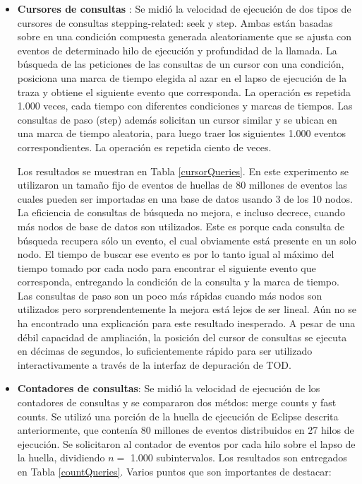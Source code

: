 \documentclass[12pt,legalpaper]{report}
\begin{document}
\begin{itemize}
	\item \textbf{Cursores de consultas} : Se midió la velocidad de ejecución de dos tipos de cursores de consultas stepping-related:  seek y step.  Ambas están basadas sobre en una condición compuesta generada aleatoriamente que se ajusta con eventos de determinado hilo de ejecución y profundidad de la llamada.  La búsqueda de las peticiones de las consultas de un cursor con una condición, posiciona una marca de tiempo elegida al azar en el lapso de ejecución de la traza y obtiene el siguiente evento que corresponda.  La operación es repetida 1.000 veces, cada tiempo con diferentes condiciones y marcas de tiempos.  Las consultas de paso (step) además solicitan un cursor similar y se ubican en una marca de tiempo aleatoria, para luego traer los siguientes 1.000 eventos correspondientes.  La operación es repetida ciento de veces.
	
Los resultados se muestran en Tabla \ref{cursorQueries}.  En este experimento se utilizaron un tamaño fijo de eventos de huellas de 80 millones de eventos las cuales pueden ser importadas en una base de datos usando 3 de los 10 nodos.  La eficiencia de consultas de búsqueda no mejora, e incluso decrece, cuando más nodos de base de datos son utilizados.  Este es porque cada consulta de búsqueda recupera sólo un evento, el cual obviamente está presente en un solo nodo.  El tiempo de buscar ese evento es por lo tanto igual al máximo del tiempo tomado por cada nodo para encontrar el siguiente evento que corresponda, entregando la condición de la consulta y la marca de tiempo. Las consultas de paso son un poco más rápidas cuando más nodos son utilizados pero sorprendentemente la mejora está lejos de ser lineal.  Aún no se ha encontrado una explicación para este resultado inesperado.  A pesar de una débil capacidad de ampliación, la posición del cursor de consultas se ejecuta en décimas de segundos, lo suficientemente rápido para ser utilizado interactivamente a través de la interfaz de depuración de TOD.
		
	\item \textbf{Contadores de consultas}:  Se midió la velocidad de ejecución de los contadores de consultas y se compararon dos métdos: merge counts y fast counts.  Se utilizó una porción de la huella de ejecución de Eclipse descrita anteriormente, que contenía 80 millones de eventos distribuidos en 27 hilos de ejecución.  Se solicitaron al contador de eventos por cada hilo sobre el lapso de la huella, dividiendo $n =$ 1.000 subintervalos.  Los resultados son entregados en Tabla \ref{countQueries}.  Varios puntos que son importantes de destacar:


\end{itemize}
\end{document}
